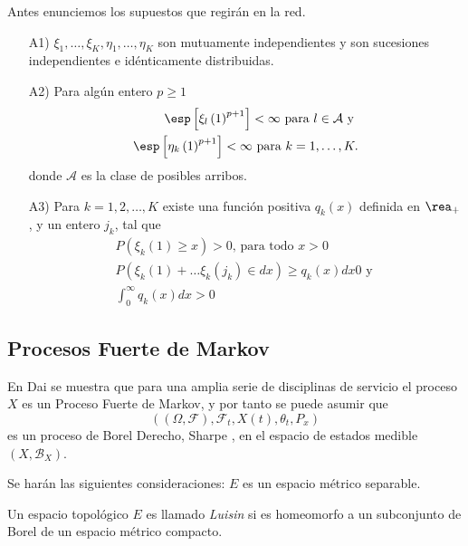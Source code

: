 Antes enunciemos los supuestos que regir\'an en la red.


\begin{itemize}
\item[A1)] $\xi_{1},\ldots,\xi_{K},\eta_{1},\ldots,\eta_{K}$ son
mutuamente independientes y son sucesiones independientes e
id\'enticamente distribuidas.

\item[A2)] Para alg\'un entero $p\geq1$
\begin{eqnarray*}
\esp\left[\xi_{l}\left(1\right)^{p+1}\right]<\infty\textrm{ para }l\in\mathcal{A}\textrm{ y }\\
\esp\left[\eta_{k}\left(1\right)^{p+1}\right]<\infty\textrm{ para
}k=1,\ldots,K.
\end{eqnarray*}
donde $\mathcal{A}$ es la clase de posibles arribos.

\item[A3)] Para $k=1,2,\ldots,K$ existe una funci\'on positiva
$q_{k}\left(x\right)$ definida en $\rea_{+}$, y un entero $j_{k}$,
tal que
\begin{eqnarray}
P\left(\xi_{k}\left(1\right)\geq x\right)>0\textrm{, para todo }x>0\\
P\left(\xi_{k}\left(1\right)+\ldots\xi_{k}\left(j_{k}\right)\in dx\right)\geq q_{k}\left(x\right)dx0\textrm{ y }\\
\int_{0}^{\infty}q_{k}\left(x\right)dx>0
\end{eqnarray}
\end{itemize}
\subsection{Procesos Fuerte de Markov}

En Dai \cite{Dai} se muestra que para una amplia serie de
disciplinas de servicio el proceso $X$ es un Proceso Fuerte de
Markov, y por tanto se puede asumir que
\[\left(\left(\Omega,\mathcal{F}\right),\mathcal{F}_{t},X\left(t\right),\theta_{t},P_{x}\right)\]
es un proceso de Borel Derecho, Sharpe \cite{Sharpe}, en el
espacio de estados medible
$\left(X,\mathcal{B}_{X}\right)$.


Se har\'an las siguientes consideraciones: $E$ es un espacio
m\'etrico separable.


\begin{Def}
Un espacio topol\'ogico $E$ es llamado {\em Luisin} si es
homeomorfo a un subconjunto de Borel de un espacio m\'etrico
compacto.
\end{Def}

